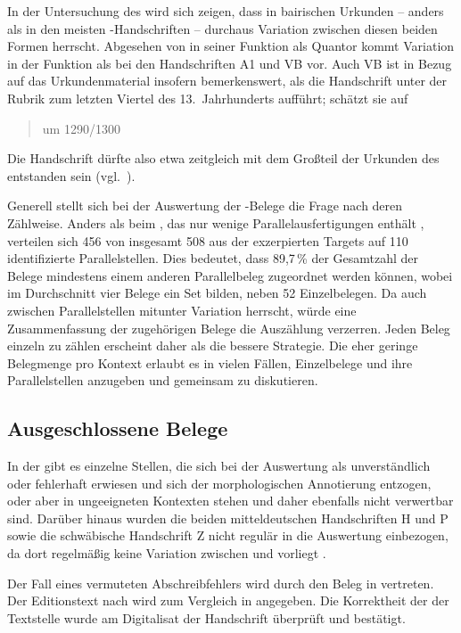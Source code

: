 In der Untersuchung des \CAO{} wird sich zeigen, dass in
bairischen Urkunden -- anders als in den meisten
\KC{}-Handschriften -- durchaus Variation zwischen diesen beiden Formen
herrscht. Abgesehen von  in seiner Funktion als Quantor kommt
Variation in der Funktion als  bei den Handschriften A1 und VB
vor. Auch VB ist in Bezug auf das Urkundenmaterial insofern bemerkenswert, als
\citet[224]{schneider1987} die Handschrift unter der Rubrik zum letzten Viertel
des 13.~Jahrhunderts aufführt; \citet[65]{wolf:kckat} schätzt sie auf
\blockquote{um 1290/1300}. Die Handschrift dürfte also etwa
zeitgleich mit dem Großteil der Urkunden des \CAO{} entstanden sein
(vgl.~).

Generell stellt sich bei der Auswertung der \KC{}-Belege die Frage nach deren
Zählweise. Anders als beim \CAO{}, das nur wenige Parallelausfertigungen
enthält \autocite[vgl.][326--328]{ganslmayeretal2003}, verteilen sich 456 von
insgesamt 508 aus der \KC{} exzerpierten Targets auf 110
identifizierte Parallelstellen. Dies bedeutet, dass 89,7\,\% der Gesamtzahl der
Belege mindestens einem anderen Parallelbeleg zugeordnet werden können, wobei
im Durchschnitt vier Belege ein Set bilden, neben 52 Einzelbelegen. Da auch
zwischen Parallelstellen mitunter Variation herrscht, würde eine
Zusammenfassung der zugehörigen Belege die Auszählung verzerren. Jeden Beleg
einzeln zu zählen erscheint daher als die bessere Strategie. Die eher geringe
Belegmenge pro Kontext erlaubt es in vielen Fällen, Einzelbelege und ihre
Parallelstellen anzugeben und gemeinsam zu diskutieren.

\subsection{Ausgeschlossene Belege}
\label{subsec:ausgeschlossene_kc}

In der \KC{} gibt es einzelne Stellen, die sich bei der Auswertung als
unverständlich oder fehlerhaft erwiesen und sich der morphologischen
Annotierung entzogen, oder aber in ungeeigneten Kontexten stehen und daher
ebenfalls nicht verwertbar sind. Darüber hinaus wurden die beiden
mitteldeutschen Handschriften H und P sowie die
schwäbische Handschrift Z nicht regulär in die Auswertung
einbezogen, da dort regelmäßig keine Variation zwischen  und
 vorliegt \autocite[vgl. auch][183]{ksw2}.

Der Fall eines vermuteten Abschreibfehlers wird durch den Beleg in
 vertreten. Der Editionstext nach \citet{schroeder1895}
wird zum Vergleich in  angegeben. Die Korrektheit der
 der Textstelle wurde am Digitalisat der
Handschrift überprüft und bestätigt.

